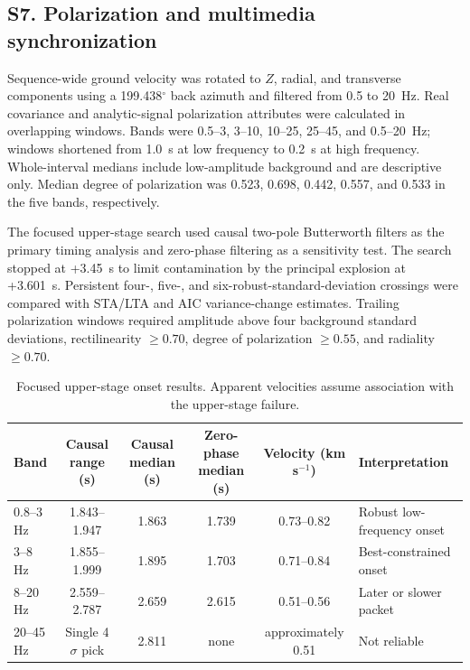 \documentclass[]{seismica}
\begin{document}
\FloatBarrier
\subsection{S7. Polarization and multimedia synchronization}
\label{sec:supp_polarization}

Sequence-wide ground velocity was rotated to $Z$, radial, and transverse
components using a 199.438$^\circ$ back azimuth and filtered from 0.5 to 20~Hz.
Real covariance and analytic-signal polarization attributes were calculated in
overlapping windows. Bands were 0.5--3, 3--10, 10--25, 25--45, and
0.5--20~Hz; windows shortened from 1.0~s at low frequency to 0.2~s at high
frequency. Whole-interval medians include low-amplitude background and are
descriptive only. Median degree of polarization was 0.523, 0.698, 0.442,
0.557, and 0.533 in the five bands, respectively.

The focused upper-stage search used causal two-pole Butterworth filters as the
primary timing analysis and zero-phase filtering as a sensitivity test. The
search stopped at +3.45~s to limit contamination by the principal explosion at
+3.601~s. Persistent four-, five-, and six-robust-standard-deviation crossings
were compared with STA/LTA and AIC variance-change estimates. Trailing
polarization windows required amplitude above four background standard
deviations, rectilinearity $\geq0.70$, degree of polarization $\geq0.55$, and
radiality $\geq0.70$.

\begin{table}[!tbp]
\centering
\caption{Focused upper-stage onset results. Apparent velocities assume
association with the upper-stage failure.}
\label{tab:supp_onsets}
\begin{tabularx}{\textwidth}{lccccX}
\hline
Band & Causal range (s) & Causal median (s) & Zero-phase median (s) & Velocity (km s$^{-1}$) & Interpretation \\
\hline
0.8--3 Hz & 1.843--1.947 & 1.863 & 1.739 & 0.73--0.82 & Robust low-frequency onset \\
3--8 Hz & 1.855--1.999 & 1.895 & 1.703 & 0.71--0.84 & Best-constrained onset \\
8--20 Hz & 2.559--2.787 & 2.659 & 2.615 & 0.51--0.56 & Later or slower packet \\
20--45 Hz & Single 4$\sigma$ pick & 2.811 & none & approximately 0.51 & Not reliable \\
\hline
\end{tabularx}
\end{table}
\end{document}
